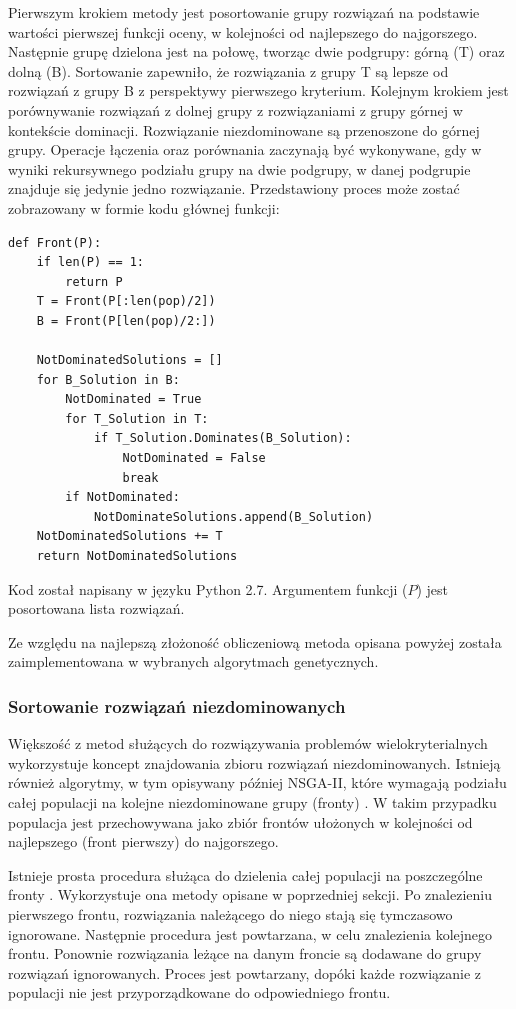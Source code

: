 \documentclass[twoside]{iisthesis}
\begin{document}
Pierwszym krokiem metody jest posortowanie grupy rozwiązań na podstawie wartości pierwszej funkcji oceny, w kolejności od najlepszego do najgorszego. Następnie grupę dzielona jest na połowę, tworząc dwie podgrupy: górną (T) oraz dolną (B). Sortowanie zapewniło, że rozwiązania z grupy T są lepsze od rozwiązań z grupy B z perspektywy pierwszego kryterium. Kolejnym krokiem jest porównywanie rozwiązań z dolnej grupy z rozwiązaniami z grupy górnej w kontekście dominacji. Rozwiązanie niezdominowane są przenoszone do górnej grupy. Operacje łączenia oraz porównania zaczynają być wykonywane, gdy w wyniki rekursywnego podziału grupy na dwie podgrupy, w danej podgrupie znajduje się jedynie jedno rozwiązanie. Przedstawiony proces może zostać zobrazowany w formie kodu głównej funkcji:
\begin{lstlisting}[label=some-code,caption=Znajdowanie rozwiązań niezdominowanych]
def Front(P):
	if len(P) == 1:
		return P
	T = Front(P[:len(pop)/2])
	B = Front(P[len(pop)/2:])
	
	NotDominatedSolutions = []
	for B_Solution in B:
		NotDominated = True
		for T_Solution in T:
			if T_Solution.Dominates(B_Solution):
				NotDominated = False
				break
		if NotDominated:
			NotDominateSolutions.append(B_Solution)
	NotDominatedSolutions += T
	return NotDominatedSolutions
\end{lstlisting}
Kod został napisany w języku Python 2.7. Argumentem funkcji ($P$) jest posortowana lista rozwiązań.

Ze względu na najlepszą złożoność obliczeniową metoda opisana powyżej została zaimplementowana w wybranych algorytmach genetycznych.

\subsubsection{Sortowanie rozwiązań niezdominowanych}
Większość z metod służących do rozwiązywania problemów wielokryterialnych wykorzystuje koncept znajdowania zbioru rozwiązań niezdominowanych. Istnieją również algorytmy, w tym opisywany później NSGA-II, które wymagają podziału całej populacji na kolejne niezdominowane grupy (fronty) \cite{book}. W takim przypadku populacja jest przechowywana jako zbiór frontów ułożonych w kolejności od najlepszego (front pierwszy) do najgorszego.

Istnieje prosta procedura służąca do dzielenia całej populacji na poszczególne fronty \cite{nsga}. Wykorzystuje ona metody opisane w poprzedniej sekcji. Po znalezieniu pierwszego frontu, rozwiązania należącego do niego stają się tymczasowo ignorowane. Następnie procedura jest powtarzana, w celu znalezienia kolejnego frontu. Ponownie rozwiązania leżące na danym froncie są dodawane do grupy rozwiązań ignorowanych. Proces jest powtarzany, dopóki każde rozwiązanie z populacji nie jest przyporządkowane do odpowiedniego frontu.
\end{document}
